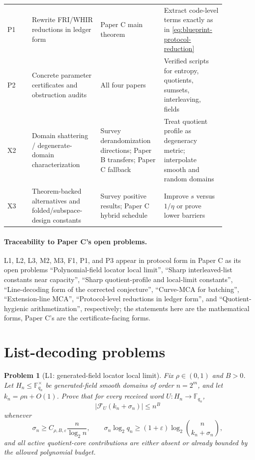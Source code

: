\documentclass[11pt]{article}
\newtheorem{problem}[theorem]{Problem}
\theoremstyle{definition}
\theoremstyle{remark}
\newcommand{\F}{\mathbb F}
\newcommand{\eps}{\varepsilon}
\newcommand{\Fib}{\mathcal F}
\newcommand{\paperB}{Paper B}
\newcommand{\paperC}{Paper C}
\begin{document}
\begin{longtable}{@{}p{0.10\linewidth}p{0.29\linewidth}p{0.24\linewidth}p{0.25\linewidth}@{}}
P1 & Rewrite FRI/WHIR reductions in ledger form & \paperC{} main theorem & Extract code-level terms exactly as in \eqref{eq:blueprint-protocol-reduction} \\
P2 & Concrete parameter certificates and obstruction audits & All four papers & Verified scripts for entropy, quotients, sumsets, interleaving, fields \\
X2 & Domain shattering / degenerate-domain characterization & Survey derandomization directions; \paperB{} transfers; \paperC{} fallback & Treat quotient profile as degeneracy metric; interpolate smooth and random domains \\
X3 & Theorem-backed alternatives and folded/subspace-design constants & Survey positive results; \paperC{} hybrid schedule & Improve $s$ versus $1/\eta$ or prove lower barriers \\
\bottomrule
\end{longtable}

\paragraph{Traceability to \paperC's open problems.}  L1, L2, L3, M2, M3, F1, P1, and P3 appear in protocol form in \paperC{} as its open problems ``Polynomial-field locator local limit'', ``Sharp interleaved-list constants near capacity'', ``Sharp quotient-profile and local-limit constants'', ``Line-decoding form of the corrected conjecture'', ``Curve-MCA for batching'', ``Extension-line MCA'', ``Protocol-level reductions in ledger form'', and ``Quotient-hygienic arithmetization'', respectively; the statements here are the mathematical forms, \paperC's are the certificate-facing forms.

\section{List-decoding problems}
\label{sec:list-problems}

\begin{problem}[L1: generated-field locator local limit]
\label{prob:L1}
Fix $\rho\in(0,1)$ and $B>0$.  Let $H_n\le\F_{q_n}^{\times}$ be generated-field smooth domains of order $n=2^m$, and let $k_n=\rho n+O(1)$.  Prove that for every received word $U:H_n\to\F_{q_n}$,
\[
        |\Fib_U(k_n+\sigma_n)|\le n^B
\]
whenever
\[
        \sigma_n\ge C_{\rho,B,\eps}\frac n{\log_2 n},
        \qquad
        \sigma_n\log_2 q_n\ge(1+\eps)\log_2\binom n{k_n+\sigma_n},
\]
and all active quotient-core contributions are either absent or already bounded by the allowed polynomial budget.
\end{problem}
\end{document}
